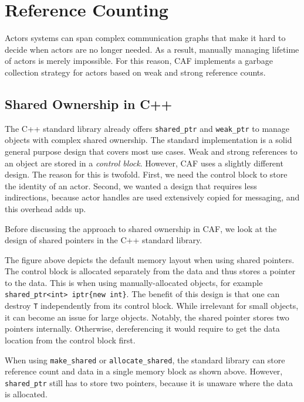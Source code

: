 \section{Reference Counting}
\label{reference-counting}

Actors systems can span complex communication graphs that make it hard to
decide when actors are no longer needed. As a result, manually managing
lifetime of actors is merely impossible. For this reason, CAF implements a
garbage collection strategy for actors based on weak and strong reference
counts.

\subsection{Shared Ownership in C++}

The C++ standard library already offers \lstinline^shared_ptr^ and
\lstinline^weak_ptr^ to manage objects with complex shared ownership. The
standard implementation is a solid general purpose design that covers most use
cases. Weak and strong references to an object are stored in a \emph{control
block}. However, CAF uses a slightly different design. The reason for this is
twofold. First, we need the control block to store the identity of an actor.
Second, we wanted a design that requires less indirections, because actor
handles are used extensively copied for messaging, and this overhead adds up.

Before discussing the approach to shared ownership in CAF, we look at the
design of shared pointers in the C++ standard library.


The figure above depicts the default memory layout when using shared pointers.
The control block is allocated separately from the data and thus stores a
pointer to the data. This is when using manually-allocated objects, for example
\lstinline^shared_ptr<int> iptr{new int}^. The benefit of this design is that
one can destroy \lstinline^T^ independently from its control block. While
irrelevant for small objects, it can become an issue for large objects.
Notably, the shared pointer stores two pointers internally. Otherwise,
dereferencing it would require to get the data location from the control block
first.


When using \lstinline^make_shared^ or \lstinline^allocate_shared^, the standard
library can store reference count and data in a single memory block as shown
above. However, \lstinline^shared_ptr^ still has to store two pointers, because
it is unaware where the data is allocated.

